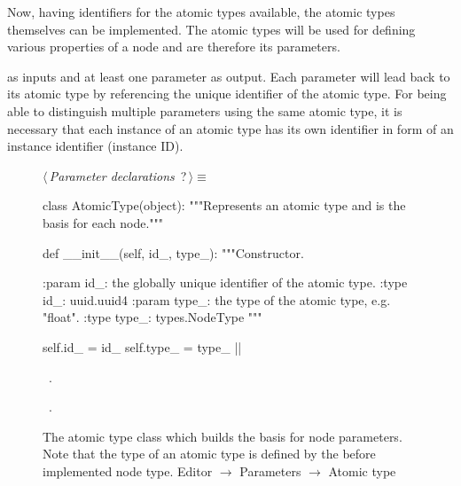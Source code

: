 \documentclass[%
    a4paper,    %
    justified,  %
    nobib,      %
    openany     %
]{tufte-book}
\begin{document}
Now, having identifiers for the atomic types available, the atomic types
themselves can be implemented. The atomic types will be used for defining
various properties of a node and are therefore its parameters.

 as inputs and at least
one parameter as output. Each parameter will lead back to its atomic type by
referencing the unique identifier of the atomic type. For being able to
distinguish multiple parameters using the same atomic type, it is necessary that
each instance of an atomic type has its own identifier in form of an instance
identifier (instance ID).

\begin{figure}
\begin{flushleft} \small
\begin{minipage}{\linewidth}\label{scrap64}\raggedright\small
{} $\langle\,${\itshape Parameter declarations}\nobreak\ {\footnotesize {?}}$\,\rangle\equiv$
\vspace{-1ex}
\begin{pythoncode}
class AtomicType(object):
    """Represents an atomic type and is the basis for each node."""

    def __init__(self, id_, type_):
        """Constructor.

        :param id_: the globally unique identifier of the atomic type.
        :type  id_: uuid.uuid4
        :param type_: the type of the atomic type, e.g. "float".
        :type  type_: types.NodeType
        """

        self.id_   = id_
        self.type_ = type_
|\NWsep|
\end{pythoncode}
\vspace{1.5ex}
\footnotesize
\begin{list}{}{\setlength{\itemsep}{-\parsep}\setlength{\itemindent}{-\leftmargin}}
\item \NWtxtMacroDefBy\ .
\item \NWtxtMacroRefIn\ .

\item{}
\end{list}
\end{minipage}\vspace{4ex}
\end{flushleft}
\caption{The atomic type class which builds the basis for node parameters. Note
  that the type of an atomic type is defined by the before implemented node
  type.
  \newline{}\newline{}Editor $\rightarrow$ Parameters $\rightarrow$ Atomic type}
\label{editor:lst:parameters:atomic-type}
\end{figure}
\end{document}
